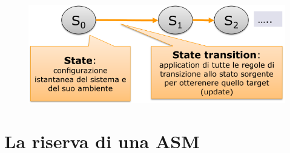 \begin{figure}[H]
    \centering
    \includegraphics[width=0.8\linewidth]{chapters/1-asm/images/esecuzione.png}
\end{figure}


\section{La riserva di una ASM}





